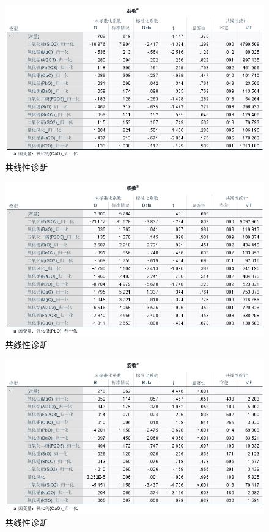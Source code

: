 \documentclass[UTF8]{ctexart}
\begin{document}
\begin{figure}[H]\centering
    \includegraphics[width=1\textwidth,height=0.6\textwidth]{img/1 (15).png} %
    \caption{共线性诊断} %
\end{figure}
\begin{figure}[H]\centering
    \includegraphics[width=1\textwidth,height=0.6\textwidth]{img/1 (16).png} %
    \caption{共线性诊断} %
\end{figure}
\begin{figure}[H]\centering
    \includegraphics[width=1\textwidth,height=0.6\textwidth]{img/1 (17).png} %
    \caption{共线性诊断} %
\end{figure}
\end{document}
